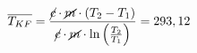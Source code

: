

\item[(b)] 
    \[
    \overline{T_{KF}} = \frac{\cancel{c} \cdot \cancel{m} \cdot (T_2 - T_1)}{\cancel{c} \cdot \cancel{m} \cdot \ln \left( \frac{T_2}{T_1} \right)} = 293,12
    \]